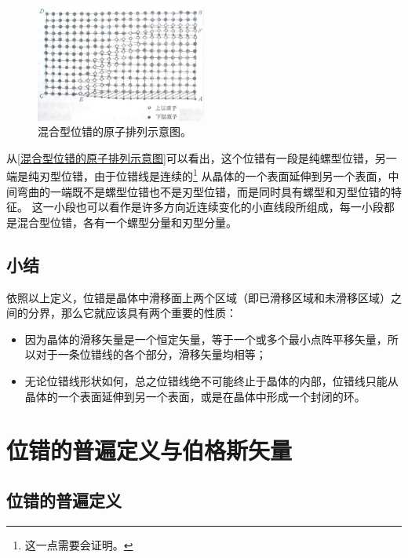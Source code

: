                 \begin{figure}[ht]
                    \centering
                    \includegraphics[width=0.5\textwidth]{fig/混合型位错的原子排列示意图.jpg}
                    \caption{混合型位错的原子排列示意图。}
                    \label{混合型位错的原子排列示意图}
                \end{figure}
                从\autoref{混合型位错的原子排列示意图}可以看出，这个位错有一段是纯螺型位错，另一端是纯刃型位错，由于位错线是连续的\footnote{这一点需要会证明。}
                从晶体的一个表面延伸到另一个表面，中间弯曲的一端既不是螺型位错也不是刃型位错，而是同时具有螺型和刃型位错的特征。
                这一小段也可以看作是许多方向近连续变化的小直线段所组成，每一小段都是混合型位错，各有一个螺型分量和刃型分量。
            \subsection{小结}
                依照以上定义，位错是晶体中滑移面上两个区域（即已滑移区域和未滑移区域）之间的分界，那么它就应该具有两个重要的性质：
                \begin{itemize}
                    \item[1] 因为晶体的滑移矢量是一个恒定矢量，等于一个或多个最小点阵平移矢量，所以对于一条位错线的各个部分，滑移矢量均相等；
                    \item[2] 无论位错线形状如何，总之位错线绝不可能终止于晶体的内部，位错线只能从晶体的一个表面延伸到另一个表面，或是在晶体中形成一个封闭的环。
                \end{itemize}
        \section{位错的普遍定义与伯格斯矢量}
            \subsection{位错的普遍定义}
                